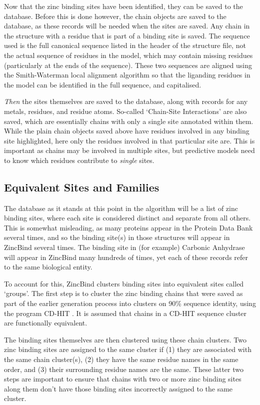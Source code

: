 Now that the zinc binding sites have been identified, they can be saved to the database. Before this is done however, the chain objects are saved to the database, as these records will be needed when the sites are saved. Any chain in the structure with a residue that is part of a binding site is saved. The sequence used is the full canonical sequence listed in the header of the structure file, not the actual sequence of residues in the model, which may contain missing residues (particularly at the ends of the sequence). These two sequences are aligned using the Smith-Waterman local alignment algorithm \cite{smith1981alignment} so that the liganding residues in the model can be identified in the full sequence, and capitalised.

\emph{Then} the sites themselves are saved to the database, along with records for any metals, residues, and residue atoms. So-called `Chain-Site Interactions' are also saved, which are essentially chains with only a single site annotated within them. While the plain chain objects saved above have residues involved in any binding site highlighted, here only the residues involved in that particular site are. This is important as chains may be involved in multiple sites, but predictive models need to know which residues contribute to \emph{single} sites.

\subsection{Equivalent Sites and Families}

The database as it stands at this point in the algorithm will be a list of zinc binding sites, where each site is considered distinct and separate from all others. This is somewhat misleading, as many proteins appear in the Protein Data Bank several times, and so the binding site(s) in those structures will appear in ZincBind several times. The binding site in (for example) Carbonic Anhydrase will appear in ZincBind many hundreds of times, yet each of these records refer to the same biological entity.

To account for this, ZincBind clusters binding sites into equivalent sites called `groups'. The first step is to cluster the zinc binding chains that were saved as part of the earlier generation process into clusters on 90\% sequence identity, using the program CD-HIT \cite{li2006cdhit}. It is assumed that chains in a CD-HIT sequence cluster are functionally equivalent.

The binding sites themselves are then clustered using these chain clusters. Two zinc binding sites are assigned to the same cluster if (1) they are associated with the same chain cluster(s), (2) they have the same residue names in the same order, and (3) their surrounding residue names are the same. These latter two steps are important to ensure that chains with two or more zinc binding sites along them don't have those binding sites incorrectly assigned to the same cluster.

